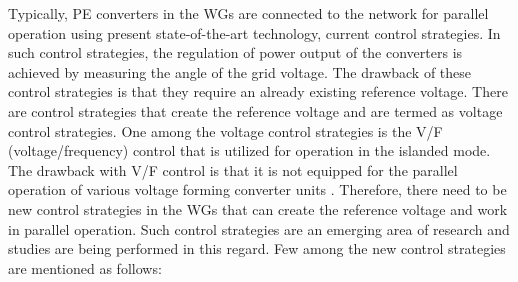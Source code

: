 Typically, \gls{PE} converters in the \gls{WG}s are connected to the network for parallel operation using present state-of-the-art technology, current control strategies. In such control strategies, the regulation of power output of the converters is achieved by measuring the angle of the grid voltage. The drawback of these control strategies is that they require an already existing reference voltage. There are control strategies that create the reference voltage and are termed as voltage control strategies. One among the voltage control strategies is the V/F (voltage/frequency) control that is utilized for operation in the islanded mode. The drawback with V/F control is that it is not equipped for the parallel operation of various voltage forming converter units \cite{weise2019comparison}. Therefore, there need to be new control strategies in the \gls{WG}s that can create the reference voltage and work in parallel operation. Such control strategies are an emerging area of research and studies are being performed in this regard. Few among the new control strategies are mentioned as follows:


